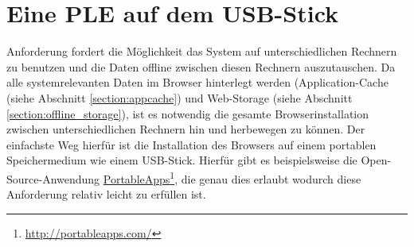 \section{Eine PLE auf dem USB-Stick}\label{section:ple_auf_usb}
Anforderung  fordert die Möglichkeit das System auf unterschiedlichen Rechnern zu benutzen und die Daten offline zwischen diesen Rechnern auszutauschen. Da alle systemrelevanten Daten im Browser hinterlegt werden (Application-Cache (siehe Abschnitt \ref{section:appcache}) und Web-Storage (siehe Abschnitt \ref{section:offline_storage}), ist es notwendig die gesamte Browserinstallation zwischen unterschiedlichen Rechnern hin und herbewegen zu können. Der einfachste Weg hierfür ist die Installation des Browsers auf einem portablen Speichermedium wie einem USB-Stick. Hierfür gibt es beispielsweise die Open-Source-Anwendung \href{http://portableapps.com/}{PortableApps}\footnote{\url{http://portableapps.com/}}, die genau dies erlaubt wodurch diese Anforderung relativ leicht zu erfüllen ist. 

